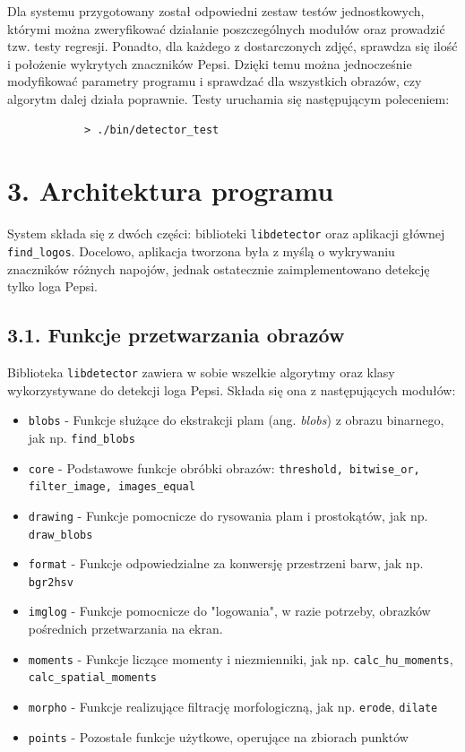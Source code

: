 \documentclass[11pt,a4paper,twoside]{report}
\begin{document}
		Dla systemu przygotowany został odpowiedni zestaw testów jednostkowych, którymi można zweryfikować działanie poszczególnych modułów oraz prowadzić tzw. testy regresji. Ponadto, dla każdego z dostarczonych zdjęć, sprawdza się ilość i położenie wykrytych znaczników Pepsi. Dzięki temu można jednocześnie modyfikować parametry programu i sprawdzać dla wszystkich obrazów, czy algorytm dalej działa poprawnie. Testy uruchamia się następującym poleceniem:
		\begin{verbatim}
		    > ./bin/detector_test
		\end{verbatim}

\section*{3. Architektura programu}

	System składa się z dwóch części: biblioteki \texttt{libdetector} oraz aplikacji głównej \texttt{find\_logos}. Docelowo, aplikacja tworzona była z myślą o wykrywaniu znaczników różnych napojów, jednak ostatecznie zaimplementowano detekcję tylko loga Pepsi.

	\subsection*{3.1. Funkcje przetwarzania obrazów}

		Biblioteka \texttt{libdetector} zawiera w sobie wszelkie algorytmy oraz klasy wykorzystywane do detekcji loga Pepsi. Składa się ona z następujących modułów:
		\begin{itemize}
			\item \texttt{blobs} - Funkcje służące do ekstrakcji plam (ang. \emph{blobs}) z obrazu binarnego, jak np. \texttt{find\_blobs}
			\item \texttt{core} - Podstawowe funkcje obróbki obrazów: \texttt{threshold, bitwise\_or, filter\_image, images\_equal}
			\item \texttt{drawing} - Funkcje pomocnicze do rysowania plam i prostokątów, jak np. \texttt{draw\_blobs}
			\item \texttt{format} - Funkcje odpowiedzialne za konwersję przestrzeni barw, jak np. \texttt{bgr2hsv}
			\item \texttt{imglog} - Funkcje pomocnicze do "logowania", w razie potrzeby, obrazków pośrednich przetwarzania na ekran.
			\item \texttt{moments} - Funkcje liczące momenty i niezmienniki, jak np. \texttt{calc\_hu\_moments}, \texttt{calc\_spatial\_moments}
			\item \texttt{morpho} - Funkcje realizujące filtrację morfologiczną, jak np. \texttt{erode}, \texttt{dilate}
			\item \texttt{points} - Pozostałe funkcje użytkowe, operujące na zbiorach punktów
		\end{itemize}
\end{document}
